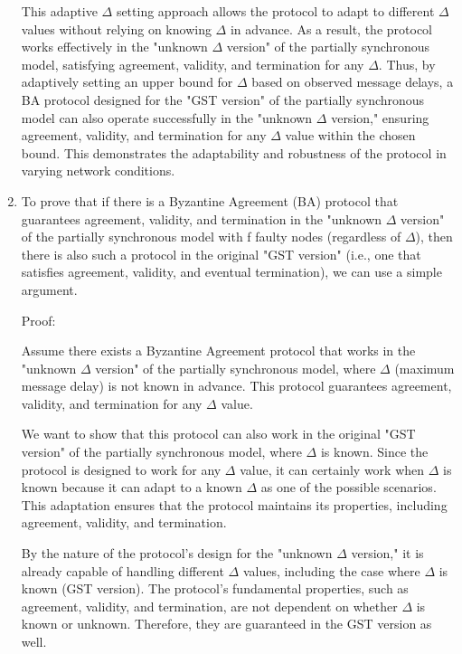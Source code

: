 \documentclass{article}
\begin{document}
\begin{enumerate}
This adaptive $\Delta$ setting approach allows the protocol to adapt to different $\Delta$ values without relying on knowing $\Delta$ in advance.
As a result, the protocol works effectively in the "unknown $\Delta$ version" of the partially synchronous model, satisfying agreement, validity, and termination for any $\Delta$.
Thus, by adaptively setting an upper bound for $\Delta$ based on observed message delays, a BA protocol designed for the "GST version" of the partially synchronous model can also operate successfully in the "unknown $\Delta$ version," ensuring agreement, validity, and termination for any $\Delta$ value within the chosen bound. This demonstrates the adaptability and robustness of the protocol in varying network conditions.
\item %

To prove that if there is a Byzantine Agreement (BA) protocol that guarantees agreement, validity, and termination in the "unknown $\Delta$ version" of the partially synchronous model with f faulty nodes (regardless of $\Delta$), then there is also such a protocol in the original "GST version" (i.e., one that satisfies agreement, validity, and eventual termination), we can use a simple argument.

Proof:


Assume there exists a Byzantine Agreement protocol that works in the "unknown $\Delta$ version" of the partially synchronous model, where $\Delta$ (maximum message delay) is not known in advance.
This protocol guarantees agreement, validity, and termination for any $\Delta$ value.

We want to show that this protocol can also work in the original "GST version" of the partially synchronous model, where $\Delta$ is known.
Since the protocol is designed to work for any $\Delta$ value, it can certainly work when $\Delta$ is known because it can adapt to a known $\Delta$ as one of the possible scenarios.
This adaptation ensures that the protocol maintains its properties, including agreement, validity, and termination.

By the nature of the protocol's design for the "unknown $\Delta$ version," it is already capable of handling different $\Delta$ values, including the case where $\Delta$ is known (GST version).
The protocol's fundamental properties, such as agreement, validity, and termination, are not dependent on whether $\Delta$ is known or unknown. Therefore, they are guaranteed in the GST version as well.


\end{enumerate}
\end{document}
